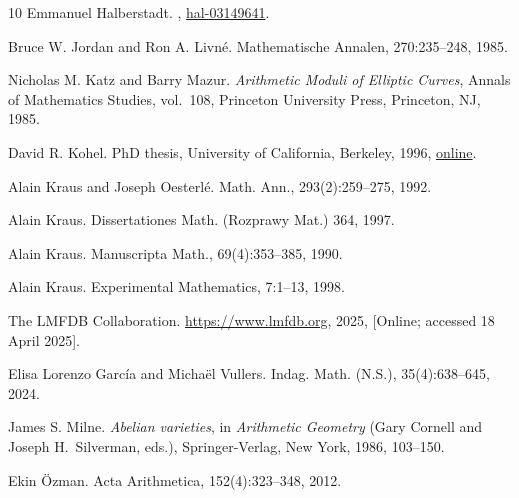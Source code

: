\documentclass[12pt]{amsart}
\numberwithin{equation}{section}
\theoremstyle{definition}
\begin{document}
\begin{thebibliography}{10}
Emmanuel Halberstadt.
, \href{https://hal.science/hal-03149641v1}{hal-03149641}.

Bruce W. Jordan and Ron A. Livn\'e.
\newblock Mathematische Annalen, 270:235--248, 1985.

Nicholas M. Katz and Barry Mazur.
\emph{Arithmetic Moduli of Elliptic Curves},
Annals of Mathematics Studies, vol.~108,
Princeton University Press, Princeton, NJ, 1985.

David R. Kohel.
\newblock PhD thesis, University of California, Berkeley, 1996,
\newblock \href{https://www.i2m.univ-amu.fr/perso/david.kohel/pub/thesis.pdf}{online}.

Alain Kraus and Joseph Oesterl\'e.
\newblock Math. Ann., 293(2):259--275, 1992.

Alain Kraus.
\newblock Dissertationes Math. (Rozprawy Mat.) 364, 1997.

Alain Kraus.
\newblock Manuscripta Math., 69(4):353--385, 1990.

Alain Kraus.
\newblock Experimental Mathematics, 7:1--13, 1998.

The {LMFDB Collaboration}.
\newblock \url{https://www.lmfdb.org}, 2025, [Online; accessed 18 April 2025].

Elisa Lorenzo Garc\'ia and Micha\"el Vullers.
\newblock Indag. Math. (N.S.), 35(4):638--645, 2024.

James S. Milne.
\emph{Abelian varieties},
in \emph{Arithmetic Geometry}
(Gary Cornell and Joseph H.~Silverman, eds.),
Springer-Verlag, New York, 1986, 103--150.

Ekin \"Ozman.
\newblock Acta Arithmetica, 152(4):323--348, 2012.


\end{thebibliography}
\end{document}

